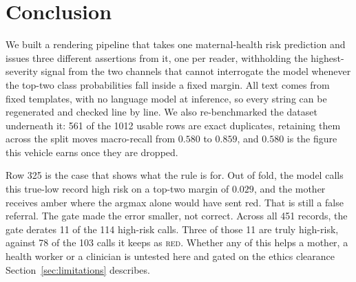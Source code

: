\section{Conclusion}
\label{sec:conclusion}

We built a rendering pipeline that takes one maternal-health risk prediction
and issues three different assertions from it, one per reader, withholding the
highest-severity signal from the two channels that cannot interrogate the
model whenever the top-two class probabilities fall inside a fixed margin.
All text comes from fixed templates, with no language model at inference, so
every string can be regenerated and checked line by line. We also re-benchmarked the dataset underneath it:
561 of the 1012 usable rows are exact duplicates, retaining them across the
split moves macro-recall from $0.580$ to $0.859$, and $0.580$ is the figure
this vehicle earns once they are dropped.

Row 325 is the case that shows what the rule is for. Out of fold, the model
calls this true-low record high risk on a top-two margin of $0.029$, and the
mother receives amber where the argmax alone would have sent red. That is still
a false referral. The gate made the error smaller, not correct. Across all 451
records, the gate derates 11 of the 114 high-risk calls. Three of those 11 are
truly high-risk, against 78 of the 103 calls it keeps as \textsc{red}. Whether any of this helps a mother, a health worker or a
clinician is untested here and gated on the ethics clearance
Section~\ref{sec:limitations} describes.
